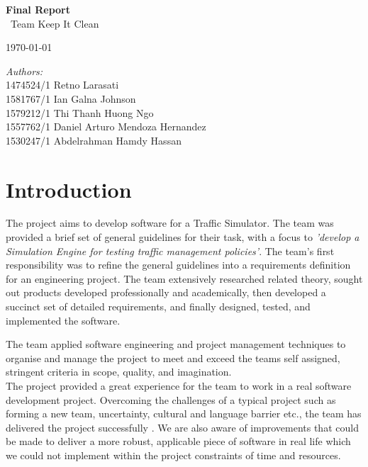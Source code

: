 \documentclass[11pt]{article}
\begin{document}
	\begin{titlepage}
	\center
	\newcommand{\HRule}{\rule{\linewidth}{0.5mm}} 

        {\huge \bfseries Final Report}\\[0.4cm]
        	\ Team Keep It Clean
        
        {\large \today}\\[10cm] 
        
        \begin{minipage}{0.4\textwidth}
        		\emph{Authors:}\\
        			1474524/1	Retno Larasati\\
                    1581767/1	Ian Galna Johnson\\	
                    1579212/1	Thi Thanh Huong Ngo\\
                    1557762/1	Daniel Arturo Mendoza Hernandez\\
                    1530247/1	Abdelrahman Hamdy Hassan\\
        \end{minipage}

\end{titlepage}
\tableofcontents
\listoffigures
\listoftables
\newpage
	
\section{Introduction}
The project aims to develop software for a Traffic Simulator. The team was provided a brief set of general guidelines for their task, with a focus to \textit{'develop a Simulation Engine for testing traffic management policies'}. The team's first responsibility was to refine the general guidelines into a requirements definition for an engineering project. The team extensively researched related theory, sought out products developed professionally and academically, then developed a succinct set of detailed requirements, and finally designed, tested, and implemented the software. 

The team applied software engineering and project management techniques to organise and manage the project to meet and exceed the teams self assigned, stringent criteria in scope, quality, and imagination.\\

The project provided a great experience for the team to work in a real software development project. Overcoming the challenges of a typical project such as forming a new team, uncertainty, cultural and language barrier etc., the team has delivered the project successfully . We are also aware  of improvements that could be made to deliver a more robust, applicable piece of software in real life which we could not implement within the project constraints of time and resources.\\
\end{document}
